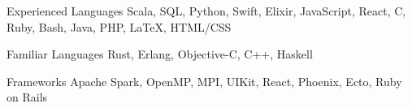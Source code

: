 

\begin{cvskills}

  \cvskill
  {Experienced Languages} %
  {Scala, SQL, Python, Swift, Elixir, JavaScript, React, C, Ruby, Bash, Java, PHP, \LaTeX, HTML/CSS} %

  \cvskill
  {Familiar Languages} %
  {Rust, Erlang, Objective-C, C++, Haskell} %

  \cvskill
  {Frameworks} %
  {Apache Spark, OpenMP, MPI, UIKit, React, Phoenix, Ecto, Ruby on Rails} %



\end{cvskills}
